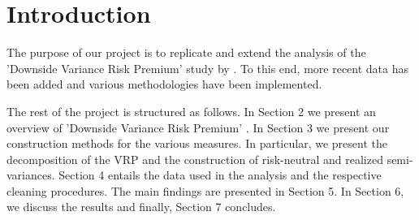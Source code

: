
\section{Introduction}\label{sec:chapter0}

The purpose of our project is to replicate and extend the analysis of the 'Downside Variance Risk Premium' study by \cite{Fenou2015}. To this end, more recent data has been added and various methodologies have been implemented. 

The rest of the project is structured as follows. In Section 2 we present an overview of 'Downside Variance Risk Premium' \cite{Fenou2015}. In Section 3 we present our construction methods for the various measures. In particular, we present the decomposition of the VRP and the construction of risk-neutral and realized semi-variances. Section 4 entails the data used in the analysis and the respective cleaning procedures. The main findings are presented in Section 5. In Section 6, we discuss the results and finally, Section 7 concludes.
